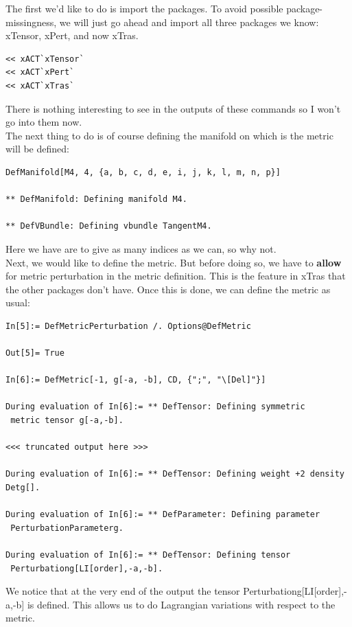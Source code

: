 \documentclass{book}
\theoremstyle{definition}
\begin{document}
The first we'd like to do is import the packages. To avoid possible package-missingness, we will just go ahead and import all three packages we know: xTensor, xPert, and now xTras.
\begin{lstlisting}
<< xACT`xTensor`
<< xACT`xPert`
<< xACT`xTras`
\end{lstlisting}
There is nothing interesting to see in the outputs of these commands so I won't go into them now. \\


The next thing to do is of course defining the manifold on which is the metric will be defined:
\begin{lstlisting}
DefManifold[M4, 4, {a, b, c, d, e, i, j, k, l, m, n, p}]

** DefManifold: Defining manifold M4. 

** DefVBundle: Defining vbundle TangentM4. 
\end{lstlisting}


Here we have are to give as many indices as we can, so why not.\\

Next, we would like to define the metric. But before doing so, we have to \textbf{allow} for metric perturbation in the metric definition. This is the feature in xTras that the other packages don't have. Once this is done, we can define the metric as usual:
\begin{lstlisting}
In[5]:= DefMetricPerturbation /. Options@DefMetric

Out[5]= True

In[6]:= DefMetric[-1, g[-a, -b], CD, {";", "\[Del]"}]

During evaluation of In[6]:= ** DefTensor: Defining symmetric
 metric tensor g[-a,-b]. 

<<< truncated output here >>>

During evaluation of In[6]:= ** DefTensor: Defining weight +2 density Detg[].

During evaluation of In[6]:= ** DefParameter: Defining parameter
 PerturbationParameterg. 

During evaluation of In[6]:= ** DefTensor: Defining tensor
 Perturbationg[LI[order],-a,-b]. 
\end{lstlisting}

We notice that at the very end of the output the tensor Perturbationg[LI[order],-a,-b] is defined. This allows us to do Lagrangian variations with respect to the metric. \\
\end{document}
